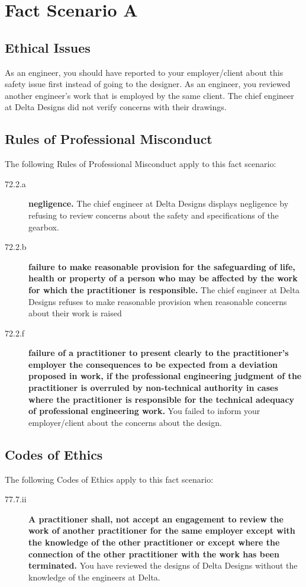 \documentclass[12pt,letterpaper]{article}
\begin{document}
\section*{Fact Scenario A}
\subsection*{Ethical Issues}
As an engineer, you should have reported to your employer/client about this safety issue first instead of going to the designer. As an engineer, you reviewed another engineer's work that is employed by the same client. The chief engineer at Delta Designs did not verify concerns with their drawings.

\subsection*{Rules of Professional Misconduct}
The following Rules of Professional Misconduct apply to this fact scenario:
\begin{description}
	\item[72.2.a] \textbf{negligence.} The chief engineer at Delta Designs displays negligence by refusing to review concerns about the safety and specifications of the gearbox.
	\item[72.2.b] \textbf{failure to make reasonable provision for the safeguarding of life, health or property of a person who may be affected by the work for which the practitioner is responsible.} The chief engineer at Delta Designs refuses to make reasonable provision when reasonable concerns about their work is raised
	\item[72.2.f] \textbf{failure of a practitioner to present clearly to the practitioner's employer the consequences to be expected from a deviation proposed in work, if the professional engineering judgment of the practitioner is overruled by non-technical authority in cases where the practitioner is responsible for the technical adequacy of professional engineering work.} You failed to inform your employer/client about the concerns about the design.
\end{description}

\subsection*{Codes of Ethics}
The following Codes of Ethics apply to this fact scenario:
\begin{description}
	\item[77.7.ii] \textbf{A practitioner shall, not accept an engagement to review the work of another practitioner for the same employer except with the knowledge of the other practitioner or except where the connection of the other practitioner with the work has been terminated.} You have reviewed the designs of Delta Designs without the knowledge of the engineers at Delta.
\end{description}
\end{document}
